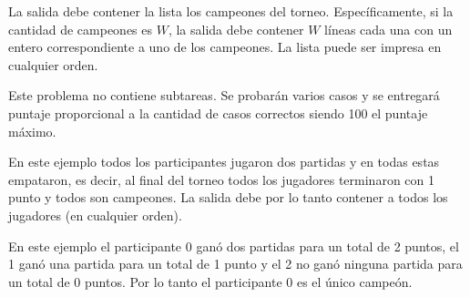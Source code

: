 \documentclass{oci}
\begin{document}
\begin{outputDescription}
  La salida debe contener la lista los campeones del torneo.
  Específicamente, si la cantidad de campeones es $W$, la salida debe contener
  $W$ líneas cada una con un entero correspondiente a uno de los campeones.
  La lista puede ser impresa en cualquier orden.
\end{outputDescription}

\begin{scoreDescription}
  Este problema no contiene subtareas.
  Se probarán varios casos y se entregará puntaje proporcional a la cantidad de casos correctos
  siendo 100 el puntaje máximo.
\end{scoreDescription}

\begin{sampleDescription}
\vspace{-1em}
En este ejemplo todos los participantes jugaron dos partidas y en todas estas empataron, es decir,
al final del torneo todos los jugadores terminaron con 1 punto y todos son campeones.
La salida debe por lo tanto contener a todos los jugadores (en cualquier orden).
\vspace{1em}

\vspace{-1em}
En este ejemplo el participante 0 ganó dos partidas para un total de 2 puntos, el 1 ganó una partida
para un total de 1 punto y el 2 no ganó ninguna partida para un total de 0 puntos.
Por lo tanto el participante 0 es el único campeón.
\end{sampleDescription}
\vspace{1em}
\end{document}
